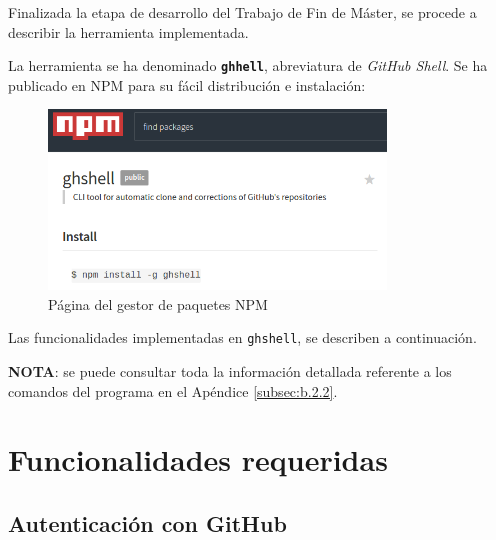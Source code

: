 

Finalizada la etapa de desarrollo del Trabajo de Fin de Máster, se procede a describir la herramienta implementada.
\bigskip

La herramienta se ha denominado {\bfseries \verb|ghhell|}, abreviatura de {\it GitHub Shell}. Se ha publicado en NPM\cite{URL:NPM} para su fácil distribución e instalación:
\bigskip

\begin{figure}[H]
\begin{center}
\includegraphics[width=0.8\textwidth]{images/npm1}
\caption{Página del gestor de paquetes NPM}
\label{fig:npm}
\end{center}
\end{figure}

Las funcionalidades implementadas en \verb|ghshell|, se describen a continuación. 
\bigskip

{\bfseries NOTA}: se puede consultar toda la información detallada referente a los comandos del programa en el Apéndice \ref{subsec:b.2.2}.

\section{Funcionalidades requeridas}
\label{3:sec:1}

\subsection{Autenticación con GitHub}
\label{subsec:3.1.1}
    
